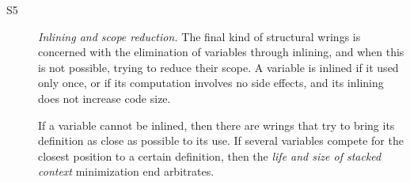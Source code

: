 \begin{description}
\item[S5] \emph{Inlining and scope reduction.}
  The final kind of structural wrings is concerned with the elimination of
  variables through inlining, and when this is not possible, trying to reduce
  their scope. A variable is inlined if it used only once, or if its
  computation involves no side effects, and its inlining does not increase code
  size.

  If a variable cannot be inlined, then there are wrings that try to bring its
  definition as close as possible to its use. If several variables compete for
  the closest position to a certain definition, then the \textit{life and size
  of stacked context} minimization end arbitrates.
\end{description}
